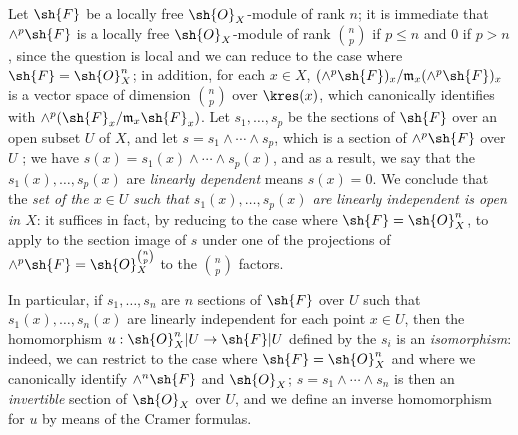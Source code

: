 \begin{env}[5.5.4]
\label{0.5.5.4}
Let $\sh{F}$ be a locally free $\sh{O}_X$-module of rank $n$;
it is immediate that $\wedge^p\sh{F}$ is a locally free $\sh{O}_X$-module of rank $\binom{n}{p}$ if $p\leq n$ and $0$ if $p>n$, since the question is local and we can reduce to the case where $\sh{F}=\sh{O}_X^n$;
in addition, for each $x\in X$, $(\wedge^p\sh{F})_x/\mathfrak{m}_x(\wedge^p\sh{F})_x$ is a vector space of dimension $\binom{n}{p}$ over $\kres(x)$, which canonically identifies with $\wedge^p(\sh{F}_x/\mathfrak{m}_x\sh{F}_x)$.
Let $s_1,\dots,s_p$ be the sections of $\sh{F}$ over an open subset $U$ of $X$, and let $s=s_1\wedge\cdots\wedge s_p$, which is a section of $\wedge^p\sh{F}$ over $U$ ;
we have $s(x)=s_1(x)\wedge\cdots\wedge s_p(x)$, and as a result, we say that the $s_1(x),\dots,s_p(x)$ are \emph{linearly dependent} means $s(x)=0$.
We conclude that the \emph{set of the $x\in U$ such that $s_1(x),\dots,s_p(x)$ are linearly independent is open in $X$}: it suffices in fact, by reducing to the case where $\sh{F}=\sh{O}_X^n$, to apply  to the section image of $s$ under one of the projections of $\wedge^p\sh{F}=\sh{O}_X^{\binom{n}{p}}$ to the $\binom{n}{p}$ factors.

In particular, if $s_1,\dots,s_n$ are $n$ sections of $\sh{F}$ over $U$ such that $s_1(x),\dots,s_n(x)$ are linearly independent for each point $x\in U$, then the homomorphism $u:\sh{O}_X^n|U\to\sh{F}|U$ defined by the $s_i$  is an \emph{isomorphism}:
indeed, we can restrict to the case where $\sh{F}=\sh{O}_X^n$ and where we canonically identify $\wedge^n\sh{F}$ and $\sh{O}_X$;
$s=s_1\wedge\cdots\wedge s_n$ is then an \emph{invertible} section of $\sh{O}_X$ over $U$, and we define an inverse homomorphism for $u$ by means of the Cramer formulas.
\end{env}

